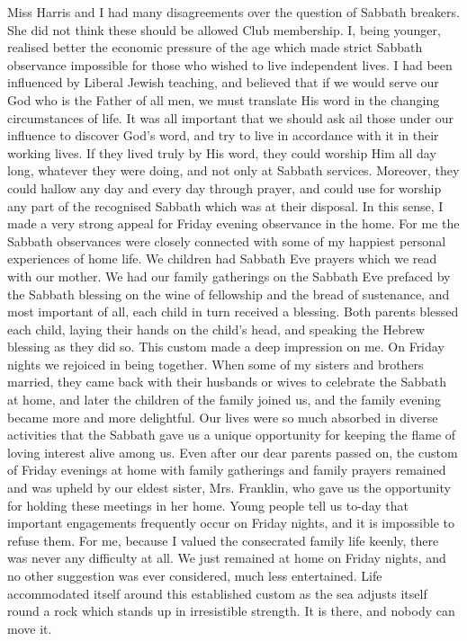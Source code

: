 Miss Harris and I had many disagreements over the
question of Sabbath breakers. She did not think these
should be allowed Club membership. I, being younger,
realised better the economic pressure of the age which
made strict Sabbath observance impossible for those who
wished to live independent lives. I had been influenced
by Liberal Jewish teaching, and believed that if we would
serve our God who is the Father of all men, we must
translate His word in the changing circumstances of life.
It was all important that we should ask ail those under
our influence to discover God’s word, and try to live in
accordance with it in their working lives. If they lived
truly by His word, they could worship Him all day long,
whatever they were doing, and not only at Sabbath services.
Moreover, they could hallow any day and every
day through prayer, and could use for worship any part
of the recognised Sabbath which was at their disposal.
In this sense, I made a very strong appeal for Friday
evening observance in the home. For me the Sabbath
observances were closely connected with some of my
happiest personal experiences of home life. We children
had Sabbath Eve prayers which we read with our
mother. We had our family gatherings on the Sabbath
Eve prefaced by the Sabbath blessing on the wine of
fellowship and the bread of sustenance, and most important
of all, each child in turn received a blessing. Both
parents blessed each child, laying their hands on the
child’s head, and speaking the Hebrew blessing as they did
so. This custom made a deep impression on me. On
Friday nights we rejoiced in being together. When some
of my sisters and brothers married, they came back with
their husbands or wives to celebrate the Sabbath at home,
and later the children of the family joined us, and the
family evening became more and more delightful. Our
lives were so much absorbed in diverse activities that the
Sabbath gave us a unique opportunity for keeping the
flame of loving interest alive among us. Even after our
dear parents passed on, the custom of Friday evenings
at home with family gatherings and family prayers
remained and was upheld by our eldest sister, Mrs.
Franklin, who gave us the opportunity for holding these
meetings in her home. Young people tell us to-day that
important engagements frequently occur on Friday
nights, and it is impossible to refuse them. For me,
because I valued the consecrated family life keenly, there
was never any difficulty at all. We just remained at home
on Friday nights, and no other suggestion was ever considered,
much less entertained. Life accommodated itself
around this established custom as the sea adjusts itself
round a rock which stands up in irresistible strength. It
is there, and nobody can move it.

